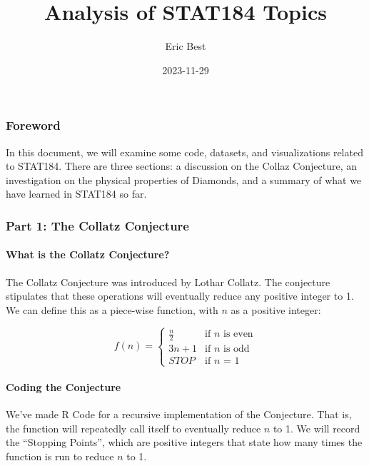 \documentclass[
]{article}
\title{Analysis of STAT184 Topics}
\author{Eric Best}
\date{2023-11-29}
\begin{document}
\maketitle

\hypertarget{foreword}{%
\subsubsection{Foreword}\label{foreword}}

In this document, we will examine some code, datasets, and
visualizations related to STAT184. There are three sections: a
discussion on the Collaz Conjecture, an investigation on the physical
properties of Diamonds, and a summary of what we have learned in STAT184
so far.

\hypertarget{part-1-the-collatz-conjecture}{%
\subsubsection{Part 1: The Collatz
Conjecture}\label{part-1-the-collatz-conjecture}}

\hypertarget{what-is-the-collatz-conjecture}{%
\paragraph{What is the Collatz
Conjecture?}\label{what-is-the-collatz-conjecture}}

The Collatz Conjecture was introduced by Lothar Collatz. The conjecture
stipulates that these operations will eventually reduce any positive
integer to 1. We can define this as a piece-wise function, with \(n\) as
a positive integer:

\[
    f(n) =
    \begin{cases}
        \frac{n}{2} & \text{if $n$ is even} \\
        3n + 1 & \text{if $n$ is odd} \\
        STOP & \text{if $n$ = 1}
    \end{cases}
\]

\hypertarget{coding-the-conjecture}{%
\paragraph{Coding the Conjecture}\label{coding-the-conjecture}}

We've made R Code for a recursive implementation of the Conjecture. That
is, the function will repeatedly call itself to eventually reduce \(n\)
to 1. We will record the ``Stopping Points'', which are positive
integers that state how many times the function is run to reduce \(n\)
to 1.
\end{document}
